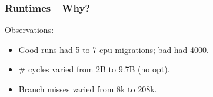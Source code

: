 \documentclass[aspectratio=43]{beamer}
\newenvironment{changemargin}[1]{%
  \begin{list}{}{%
    \setlength{\topsep}{0pt}%
    \setlength{\leftmargin}{#1}%
    \setlength{\rightmargin}{1em}
    \setlength{\listparindent}{\parindent}%
    \setlength{\itemindent}{\parindent}%
    \setlength{\parsep}{\parskip}%
  }%
  \item[]}{\end{list}}
\begin{document}
\begin{frame}[containsverbatim]
  \frametitle{Runtimes---Why?}

  \begin{changemargin}{1.5cm}
    Observations:\\[1em]
    \begin{itemize}
    \item Good runs had 5 to 7 cpu-migrations; bad had 4000.
    \item \# cycles varied from 2B to 9.7B (no opt).\\
    \item Branch misses varied from 8k to 208k.
    \end{itemize}
  \end{changemargin}
    

    


        
    
\end{frame}
\end{document}
